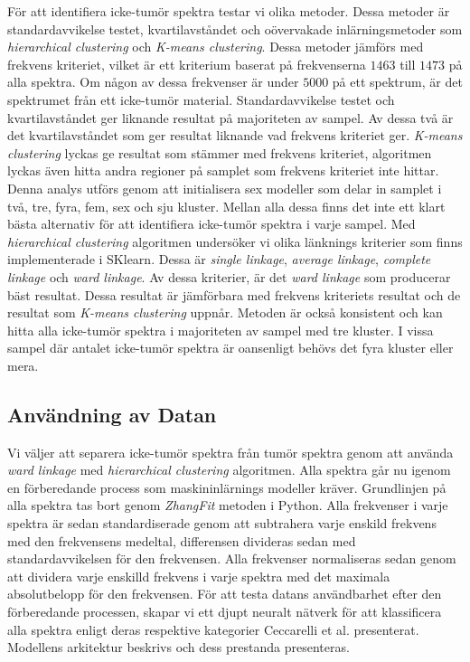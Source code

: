 För att identifiera icke-tumör spektra testar vi olika metoder. Dessa metoder är standardavvikelse testet, kvartilavståndet och oövervakade inlärningsmetoder som \textit{hierarchical clustering} och \textit{K-means clustering}. Dessa metoder jämförs med frekvens kriteriet, vilket är ett kriterium baserat på frekvenserna $1463$ till $1473$ på alla spektra. Om någon av dessa frekvenser är under $5000$ på ett spektrum, är det spektrumet från ett icke-tumör material. Standardavvikelse testet och kvartilavståndet ger liknande resultat på majoriteten av sampel. Av dessa två är det kvartilavståndet som ger resultat liknande vad frekvens kriteriet ger. \textit{K-means clustering} lyckas ge resultat som stämmer med frekvens kriteriet, algoritmen lyckas även hitta andra regioner på samplet som frekvens kriteriet inte hittar. Denna analys utförs genom att initialisera sex modeller som delar in samplet i två, tre, fyra, fem, sex och sju kluster. Mellan alla dessa finns det inte ett klart bästa alternativ för att identifiera icke-tumör spektra i varje sampel. Med \textit{hierarchical clustering} algoritmen undersöker vi olika länknings kriterier som finns implementerade i SKlearn. Dessa är \textit{single linkage}, \textit{average linkage}, \textit{complete linkage} och \textit{ward linkage}. Av dessa kriterier, är det \textit{ward linkage} som producerar bäst resultat. Dessa resultat är jämförbara med frekvens kriteriets resultat och de resultat som \textit{K-means clustering} uppnår. Metoden är också konsistent och kan hitta alla icke-tumör spektra i majoriteten av sampel med tre kluster. I vissa sampel där antalet icke-tumör spektra är oansenligt behövs det fyra kluster eller mera.

\subsection*{Användning av Datan}

Vi väljer att separera icke-tumör spektra från tumör spektra genom att använda \textit{ward linkage} med \textit{hierarchical clustering} algoritmen. Alla spektra går nu igenom en förberedande process som maskininlärnings modeller kräver. Grundlinjen på alla spektra tas bort genom \textit{ZhangFit} metoden i Python. Alla frekvenser i varje spektra är sedan standardiserade genom att subtrahera varje enskild frekvens med den frekvensens medeltal, differensen divideras sedan med standardavvikelsen för den frekvensen. Alla frekvenser normaliseras sedan genom att dividera varje enskilld frekvens i varje spektra med det maximala absolutbelopp för den frekvensen. För att testa datans användbarhet efter den förberedande processen, skapar vi ett djupt neuralt nätverk för att klassificera alla spektra enligt deras respektive kategorier Ceccarelli et al. \cite{cellsubsets} presenterat. Modellens arkitektur beskrivs och dess prestanda presenteras. 


